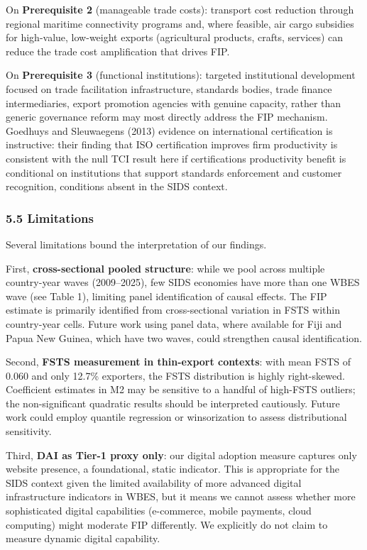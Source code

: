 \documentclass[12pt,a4paper]{article}
\begin{document}
On \textbf{Prerequisite 2} (manageable trade costs): transport cost
reduction through regional maritime connectivity programs and, where
feasible, air cargo subsidies for high-value, low-weight exports
(agricultural products, crafts, services) can reduce the trade cost
amplification that drives FIP.

On \textbf{Prerequisite 3} (functional institutions): targeted
institutional development focused on trade facilitation infrastructure,
standards bodies, trade finance intermediaries, export promotion
agencies with genuine capacity, rather than generic governance reform
may most directly address the FIP mechanism. Goedhuys and
Sleuwaegen\textquotesingle s (2013) evidence on international
certification is instructive: their finding that ISO certification
improves firm productivity is consistent with the null TCI result here
if certification\textquotesingle s productivity benefit is conditional
on institutions that support standards enforcement and customer
recognition, conditions absent in the SIDS context.

\hypertarget{55-limitations}{%
\subsubsection{5.5 Limitations}\label{55-limitations}}

Several limitations bound the interpretation of our findings.

First, \textbf{cross-sectional pooled structure}: while we pool across
multiple country-year waves (2009--2025), few SIDS economies have more
than one WBES wave (see Table 1), limiting panel identification of
causal effects. The FIP estimate is primarily identified from
cross-sectional variation in FSTS within country-year cells. Future work
using panel data, where available for Fiji and Papua New Guinea, which
have two waves, could strengthen causal identification.

Second, \textbf{FSTS measurement in thin-export contexts}: with mean
FSTS of 0.060 and only 12.7\% exporters, the FSTS distribution is highly
right-skewed. Coefficient estimates in M2 may be sensitive to a handful
of high-FSTS outliers; the non-significant quadratic results should be
interpreted cautiously. Future work could employ quantile regression or
winsorization to assess distributional sensitivity.

Third, \textbf{DAI as Tier-1 proxy only}: our digital adoption measure
captures only website presence, a foundational, static indicator. This
is appropriate for the SIDS context given the limited availability of
more advanced digital infrastructure indicators in WBES, but it means we
cannot assess whether more sophisticated digital capabilities
(e-commerce, mobile payments, cloud computing) might moderate FIP
differently. We explicitly do not claim to measure dynamic digital
capability.
\end{document}
